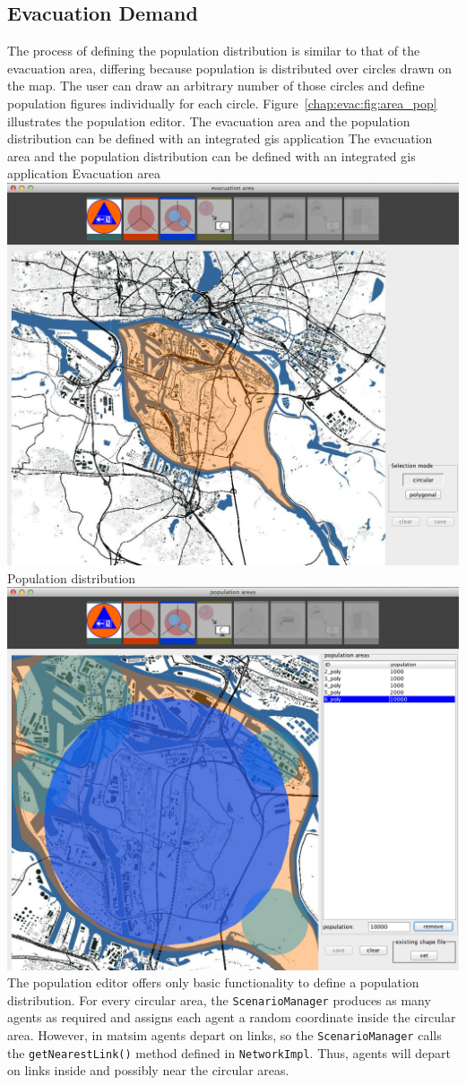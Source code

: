 \subsection{Evacuation Demand}
The process of defining the population distribution is similar to that of the evacuation area, differing because population is distributed over circles drawn on the map. The user can draw an arbitrary number of those circles and define population figures individually for each circle. Figure~\ref{chap:evac:fig:area_pop} illustrates the population editor. 
%
\createfigure%
{The evacuation area and the population distribution can be defined with an integrated \protect\gls{gis} application}%
{The evacuation area and the population distribution can be defined with an integrated \protect\gls{gis} application}%
{\label{chap:evac:fig:area_pop}}%
{%
  \createsubfigure%
  {Evacuation area}%
{\includegraphics[width=.475\linewidth]{extending/figures/Evacuation/evac_area_sel}}
  {}%
  {}%
  \createsubfigure%
  {Population distribution}%
{\includegraphics[width=.475\linewidth]{extending/figures/Evacuation/pop_sel}}
  {}%
  {}%
}%
  {}%
%
The population editor offers only basic functionality to define a population distribution. For every circular area, the \lstinline|ScenarioManager| produces as many agents as required and assigns each agent a random coordinate inside the circular area. However, in \gls{matsim} agents depart on links, so the \lstinline|ScenarioManager| calls the \lstinline|getNearestLink()| method defined in \lstinline|NetworkImpl|. Thus, agents will depart on links inside and possibly near the circular areas. 

